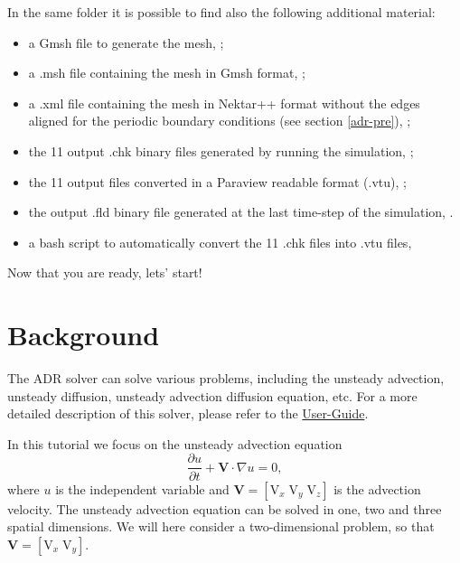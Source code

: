 In the same folder it is possible to find also the following additional material:
\vspace{-0.5cm}
\begin{itemize}
\item a Gmsh file to generate the mesh, ;
\item a .msh file containing the mesh in Gmsh format, ;
\item a .xml file containing the mesh in Nektar++ format without the edges aligned 
for the periodic boundary conditions (see section \ref{adr-pre}), ;
\item the 11 output .chk binary files generated by running the simulation, ;
\item the 11 output files converted in a Paraview readable format (.vtu),  ;
\item the output .fld binary file generated at the last time-step of the simulation, .
\item a bash script to automatically convert the 11 .chk files into .vtu files, 
\end{itemize}

\begin{center}
Now that you are ready, lets' start!
\end{center}

\section{Background}
The ADR solver can solve various problems, including the unsteady advection, unsteady diffusion, 
unsteady advection diffusion equation, etc. For a more detailed description of this solver, please 
refer to the \href{http://www.nektar.info/downloads/8}{User-Guide}. 

In this tutorial we focus on the unsteady advection equation
\begin{equation}
\dfrac{\partial u}{\partial t} + \mathbf{V}\cdot\nabla u = 0,
\label{eq:advection}
\end{equation}
where $u$ is the independent variable and $\mathbf{V} = [\text{V}_{x}\; \text{V}_{y}\; \text{V}_{z}]$ 
is the advection velocity. The unsteady advection equation can be solved in one, two and three spatial 
dimensions. We will here consider a two-dimensional problem, so that $\mathbf{V} = [\text{V}_{x}\; \text{V}_{y}]$.

